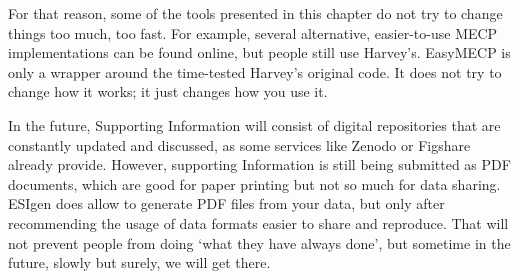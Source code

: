 For that reason, some of the tools presented in this chapter do not try to change things too much, too fast. For example, several alternative, easier-to-use MECP implementations can be found online,\cite{mecpro,mecpy,sobmecp} but people still use Harvey's. EasyMECP is only a wrapper around the time-tested Harvey’s original code. It does not try to change how it works; it just changes how you use it.

In the future, Supporting Information will consist of digital repositories that are constantly updated and discussed, as some services like Zenodo\cite{zenodo} or Figshare\cite{figshare} already provide. However, supporting Information is still being submitted as PDF documents, which are good for paper printing but not so much for data sharing. ESIgen does allow to generate PDF files from your data, but only after recommending the usage of data formats easier to share and reproduce. That will not prevent people from doing ‘what they have always done’, but sometime in the future, slowly but surely, we will get there.
